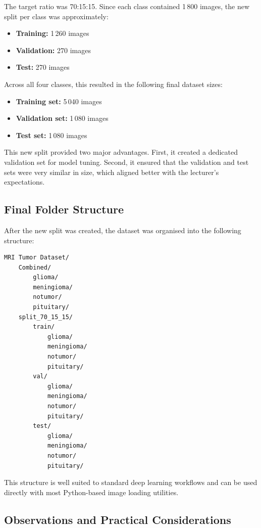 \documentclass{article}
\begin{document}
The target ratio was 70:15:15. Since each class contained 1\,800 images, the new split per class was approximately:

\begin{itemize}
    \item \textbf{Training:} 1\,260 images
    \item \textbf{Validation:} 270 images
    \item \textbf{Test:} 270 images
\end{itemize}

Across all four classes, this resulted in the following final dataset sizes:

\begin{itemize}
    \item \textbf{Training set:} 5\,040 images
    \item \textbf{Validation set:} 1\,080 images
    \item \textbf{Test set:} 1\,080 images
\end{itemize}

This new split provided two major advantages. First, it created a dedicated validation set for model tuning. Second, it ensured that the validation and test sets were very similar in size, which aligned better with the lecturer's expectations.

\subsection{Final Folder Structure}

After the new split was created, the dataset was organised into the following structure:

\begin{verbatim}
MRI Tumor Dataset/
    Combined/
        glioma/
        meningioma/
        notumor/
        pituitary/
    split_70_15_15/
        train/
            glioma/
            meningioma/
            notumor/
            pituitary/
        val/
            glioma/
            meningioma/
            notumor/
            pituitary/
        test/
            glioma/
            meningioma/
            notumor/
            pituitary/
\end{verbatim}

This structure is well suited to standard deep learning workflows and can be used directly with most Python-based image loading utilities.

\subsection{Observations and Practical Considerations}
\end{document}
